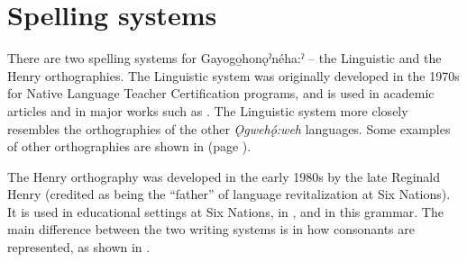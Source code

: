 \chapter{Spelling systems} \label{Spelling systems}
There are two spelling systems for Gayogo̱honǫˀnéha:ˀ -- the Linguistic and the Henry orthographies. The Linguistic system was originally developed in the 1970s for Native Language Teacher Certification programs, and is used in academic articles and in major works such as \citet{mithun_watewayestanih_1984}. The Linguistic system more closely resembles the orthographies of the other \textit{Ǫgwehǫ́:weh} languages. Some examples of other orthographies are shown in  (page \pageref{figtab:1:twofive}). 

The Henry orthography was developed in the early 1980s by the late Reginald Henry (credited as being the “father” of language revitalization at Six Nations). It is used in educational settings at Six Nations, in \citet{froman_english-cayugacayuga-english_2002}, and in this grammar. The main difference between the two writing systems is in how consonants are represented, as shown in . 

\begin{table}
\caption{Consonant spellings compared\label{figtab:1:consspell}}
\end{table}

